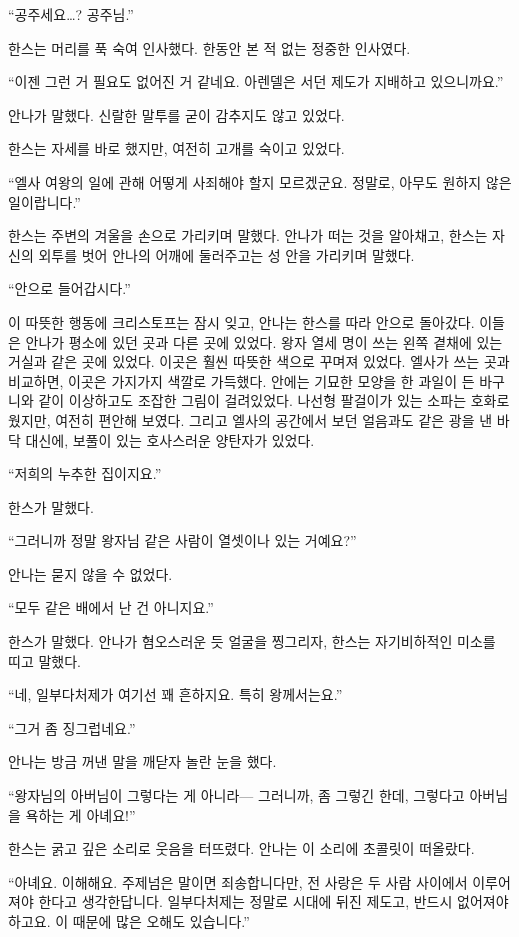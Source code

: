 ``공주세요\ldots? 공주님.''

한스는 머리를 푹 숙여 인사했다. 한동안 본 적 없는 정중한 인사였다.

``이젠 그런 거 필요도 없어진 거 같네요. 아렌델은 서던 제도가 지배하고 있으니까요.''

안나가 말했다. 신랄한 말투를 굳이 감추지도 않고 있었다.

한스는 자세를 바로 했지만, 여전히 고개를 숙이고 있었다.

``엘사 여왕의 일에 관해 어떻게 사죄해야 할지 모르겠군요. 정말로, 아무도 원하지 않은 일이랍니다.''

한스는 주변의 겨울을 손으로 가리키며 말했다. 안나가 떠는 것을 알아채고, 한스는 자신의 외투를 벗어 안나의 어깨에 둘러주고는 성 안을 가리키며 말했다.

``안으로 들어갑시다.''

이 따뜻한 행동에 크리스토프는 잠시 잊고, 안나는 한스를 따라 안으로 돌아갔다. 이들은 안나가 평소에 있던 곳과 다른 곳에 있었다. 왕자 열세 명이 쓰는 왼쪽 곁채에 있는 거실과 같은 곳에 있었다. 이곳은 훨씬 따뜻한 색으로 꾸며져 있었다. 엘사가 쓰는 곳과 비교하면, 이곳은 가지가지 색깔로 가득했다. 안에는 기묘한 모양을 한 과일이 든 바구니와 같이 이상하고도 조잡한 그림이 걸려있었다. 나선형 팔걸이가 있는 소파는 호화로웠지만, 여전히 편안해 보였다. 그리고 엘사의 공간에서 보던 얼음과도 같은 광을 낸 바닥 대신에, 보풀이 있는 호사스러운 양탄자가 있었다.

``저희의 누추한 집이지요.''

한스가 말했다.

``그러니까 정말 왕자님 같은 사람이 열셋이나 있는 거예요?''

안나는 묻지 않을 수 없었다.

``모두 같은 배에서 난 건 아니지요.''

한스가 말했다. 안나가 혐오스러운 듯 얼굴을 찡그리자, 한스는 자기비하적인 미소를 띠고 말했다.

``네, 일부다처제가 여기선 꽤 흔하지요. 특히 왕께서는요.''

``그거 좀 징그럽네요.''

안나는 방금 꺼낸 말을 깨닫자 놀란 눈을 했다.

``왕자님의 아버님이 그렇다는 게 아니라— 그러니까, 좀 그렇긴 한데, 그렇다고 아버님을 욕하는 게 아녜요!''

한스는 굵고 깊은 소리로 웃음을 터뜨렸다. 안나는 이 소리에 초콜릿이 떠올랐다.

``아녜요. 이해해요. 주제넘은 말이면 죄송합니다만, 전 사랑은 두 사람 사이에서 이루어져야 한다고 생각한답니다. 일부다처제는 정말로 시대에 뒤진 제도고, 반드시 없어져야 하고요. 이 때문에 많은 오해도 있습니다.''

